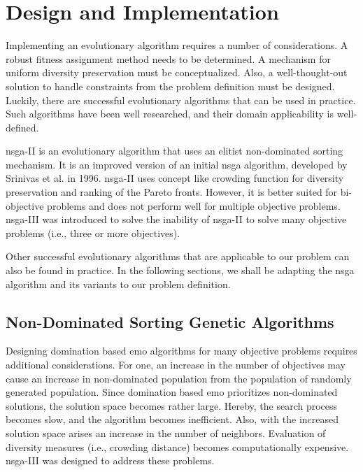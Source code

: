 \chapter{Design and Implementation}\label{chapter:prototype_implementation}

Implementing an evolutionary algorithm requires a number of considerations. A robust fitness assignment method needs to be determined. A mechanism for uniform diversity preservation must be conceptualized. Also, a well-thought-out solution to handle constraints from the problem definition must be designed. Luckily, there are successful evolutionary algorithms that can be used in practice. Such algorithms have been well researched, and their domain applicability is well-defined. 

\Gls{nsga}-II \parencite{Jain2013AnOptimization} is an evolutionary algorithm that uses an elitist non-dominated sorting mechanism. It is an improved version of an initial \gls{nsga} algorithm, developed by  Srinivas et al. \parencite{Srinivas1994MuiltiobjectiveAlgorithms} in 1996. 
\Gls{nsga}-II uses concept like crowding function for diversity preservation and ranking of the Pareto fronts. However, it is better suited for bi-objective problems and does not perform well for multiple objective problems. \Gls{nsga}-III \parencite{Mkaouer2015Many-objectiveNSGA-III} was introduced to solve the inability of \gls{nsga}-II to solve many objective problems (i.e., three or more objectives).

Other successful evolutionary algorithms that are applicable to our problem can also be found in practice. In the following sections, we shall be adapting the \gls{nsga} algorithm and its variants to our problem definition.

\section{Non-Dominated Sorting Genetic Algorithms}
Designing domination based \gls{emo} algorithms for many objective problems requires additional considerations. For one, an increase in the number of objectives may cause an increase in non-dominated population from the population of randomly generated population. Since domination based \gls{emo} prioritizes non-dominated solutions, the solution space becomes rather large. Hereby, the search process becomes slow, and the algorithm becomes inefficient. Also, with the increased solution space arises an increase in the number of neighbors. Evaluation of diversity measures (i.e., crowding distance) becomes computationally expensive. \gls{nsga}-III was designed to address these problems. 


